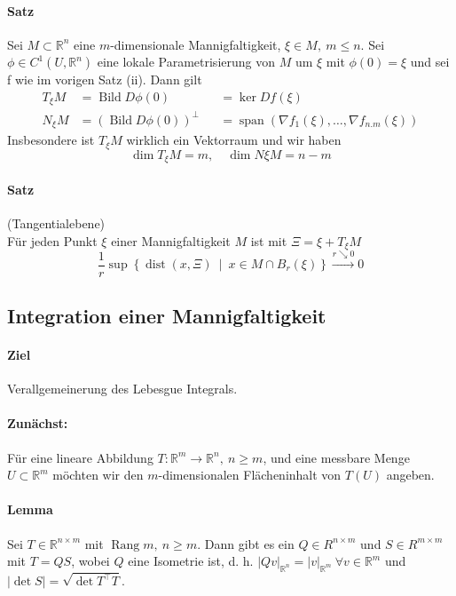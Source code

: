\documentclass[12pt,a4paper,fleqn]{article}
\def\abs#1{{\left\vert #1 \right\vert}}
\def\set#1{{\left\{ #1 \right\}}}
\def\Mid{\ \middle|\ }
\def\R{{\mathbb{R}}}
\begin{document}
\paragraph{Satz} Sei $M \subset \R^n$ eine $m$-dimensionale Mannigfaltigkeit, $\xi \in M,\ m \leq n$. Sei $\phi \in C^1(U, \R^n)$ eine lokale Parametrisierung von $M$ um $\xi$ mit $\phi(0) = \xi$ und sei f wie im vorigen Satz (ii). Dann gilt
\begin{align*}
T_\xi M &= \operatorname{Bild} D\phi(0) &&= \ker Df(\xi) \\
N_\xi M &= (\operatorname{Bild} D\phi(0))^\perp &&= \operatorname{span}(\nabla f_1(\xi), \dots, \nabla f_{n.m}(\xi))
\end{align*}
Insbesondere ist $T_\xi M$ wirklich ein Vektorraum und wir haben 
\begin{displaymath}
\dim T_\xi M = m,\quad \dim N\xi M = n-m
\end{displaymath}

\paragraph{Satz} (Tangentialebene)\\
Für jeden Punkt $\xi$ einer Mannigfaltigkeit $M$ ist mit $\Xi = \xi + T_\xi M$
\begin{displaymath}
\frac{1}{r}\sup\set{\operatorname{dist}(x, \Xi) \Mid x \in M\cap B_r(\xi)} \xrightarrow{r \searrow 0} 0
\end{displaymath}

\subsection{Integration einer Mannigfaltigkeit}

\paragraph{Ziel} Verallgemeinerung des Lebesgue Integrals.

\paragraph{Zunächst:} Für eine lineare Abbildung $T \colon \R^m \rightarrow \R^n,\ n \geq m$, und eine messbare Menge $U \subset \R^m$ möchten wir den $m$-dimensionalen Flächeninhalt von $T(U)$ angeben.

\paragraph{Lemma} Sei $T \in \R^{n \times m}$ mit $\operatorname{Rang} m,\ n \geq m$. Dann gibt es ein $Q \in R^{n \times m}$ und $S \in R^{m \times m}$ mit $T = QS$, wobei $Q$ eine Isometrie ist, d. h. $\abs{Qv}_{\R^n} = \abs{v}_{\R^m}\ \forall v \in \R^m$ und $\abs{\det S} = \sqrt{\det T^\top T}$.
\end{document}
